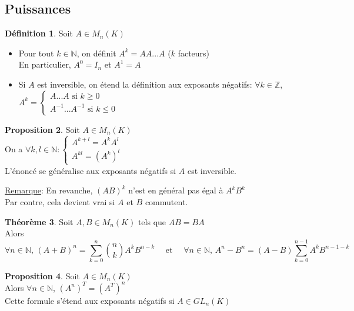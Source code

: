 \documentclass[10pt,a4paper]{article}
\theoremstyle{definition}
\newtheorem{proposition}{Proposition}[section]
\newtheorem{theorem}[proposition]{Théorème}
\newtheorem{definition}[proposition]{Définition}
\begin{document}
\subsection{Puissances}
\begin{definition}
Soit $A \in M_n(K)$
\begin{itemize}
\item Pour tout $k \in \mathbb{N}$, on définit $A^k = A A ... A$ ($k$ facteurs) \\
En particulier, $A^0 = I_n$ et $A^1 = A$
\item Si $A$ est inversible, on étend la définition aux exposants négatifs: $\forall k \in \mathbb{Z}$, $A^k = \begin{cases}
A ... A \text{ si } k \geq 0 \\
A^{-1} ... A^{-1} \text{ si } k \leq 0
\end{cases}$
\end{itemize}
\end{definition}
\begin{proposition}
Soit $A \in M_n(K)$ \\
On a $\forall k, l \in \mathbb{N} : \begin{cases}
A^{k + l} = A^k A^l \\
A^{kl} = \left(A^k\right)^l
\end{cases}$ \\
L'énoncé se généralise aux exposants négatifs si $A$ est inversible.
\end{proposition}
\noindent \uline{Remarque}: En revanche, $(AB)^k$ n'est en général pas égal à $A^k B^k$ \\
Par contre, cela devient vrai si $A$ et $B$ commutent.
\begin{theorem}
Soit $A, B \in M_n(K)$ tels que $AB = BA$ \\
Alors
\[ \forall n \in \mathbb{N},\, (A + B)^n = \sum_{k = 0}^n \binom{n}{k} A^k B^{n - k} \quad \text{ et } \quad \forall n \in \mathbb{N},\, A^n - B^n = (A - B) \sum_{k = 0}^{n-1} A^k B^{n - 1 - k}\]
\end{theorem}
\begin{proposition}
Soit $A \in M_n(K)$ \\
Alors $\forall n \in \mathbb{N}$, $\left(A^n\right)^T = \left(A^T\right)^n$ \\
Cette formule s'étend aux exposants négatifs si $A \in GL_n(K)$
\end{proposition}
\end{document}
